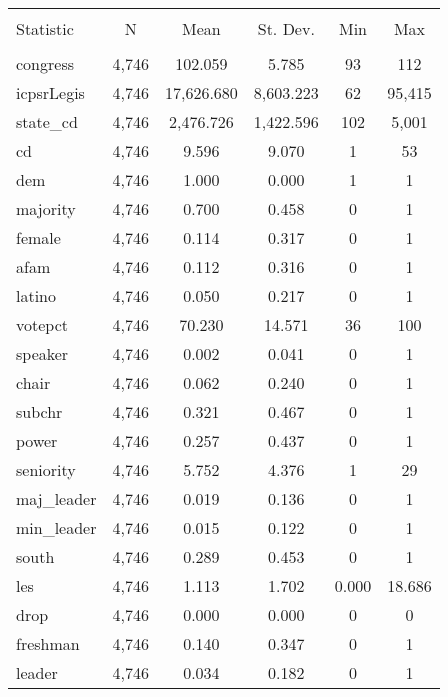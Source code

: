 \documentclass[12pt]{article}
\begin{document}
\begin{table}[!htbp] \centering 
	\caption{} 
	\label{} 
	\begin{tabular}{@{\extracolsep{5pt}}lccccc} 
		\\[-1.8ex]\hline 
		\hline \\[-1.8ex] 
		Statistic & \multicolumn{1}{c}{N} & \multicolumn{1}{c}{Mean} & \multicolumn{1}{c}{St. Dev.} & \multicolumn{1}{c}{Min} & \multicolumn{1}{c}{Max} \\ 
		\hline \\[-1.8ex] 
		congress & 4,746 & 102.059 & 5.785 & 93 & 112 \\ 
		icpsrLegis & 4,746 & 17,626.680 & 8,603.223 & 62 & 95,415 \\ 
		state\_cd & 4,746 & 2,476.726 & 1,422.596 & 102 & 5,001 \\ 
		cd & 4,746 & 9.596 & 9.070 & 1 & 53 \\ 
		dem & 4,746 & 1.000 & 0.000 & 1 & 1 \\ 
		majority & 4,746 & 0.700 & 0.458 & 0 & 1 \\ 
		female & 4,746 & 0.114 & 0.317 & 0 & 1 \\ 
		afam & 4,746 & 0.112 & 0.316 & 0 & 1 \\ 
		latino & 4,746 & 0.050 & 0.217 & 0 & 1 \\ 
		votepct & 4,746 & 70.230 & 14.571 & 36 & 100 \\ 
		speaker & 4,746 & 0.002 & 0.041 & 0 & 1 \\ 
		chair & 4,746 & 0.062 & 0.240 & 0 & 1 \\ 
		subchr & 4,746 & 0.321 & 0.467 & 0 & 1 \\ 
		power & 4,746 & 0.257 & 0.437 & 0 & 1 \\ 
		seniority & 4,746 & 5.752 & 4.376 & 1 & 29 \\ 
		maj\_leader & 4,746 & 0.019 & 0.136 & 0 & 1 \\ 
		min\_leader & 4,746 & 0.015 & 0.122 & 0 & 1 \\ 
		south & 4,746 & 0.289 & 0.453 & 0 & 1 \\ 
		les & 4,746 & 1.113 & 1.702 & 0.000 & 18.686 \\ 
		drop & 4,746 & 0.000 & 0.000 & 0 & 0 \\ 
		freshman & 4,746 & 0.140 & 0.347 & 0 & 1 \\ 
		leader & 4,746 & 0.034 & 0.182 & 0 & 1 \\ 

\end{tabular}
\end{table}
\end{document}
